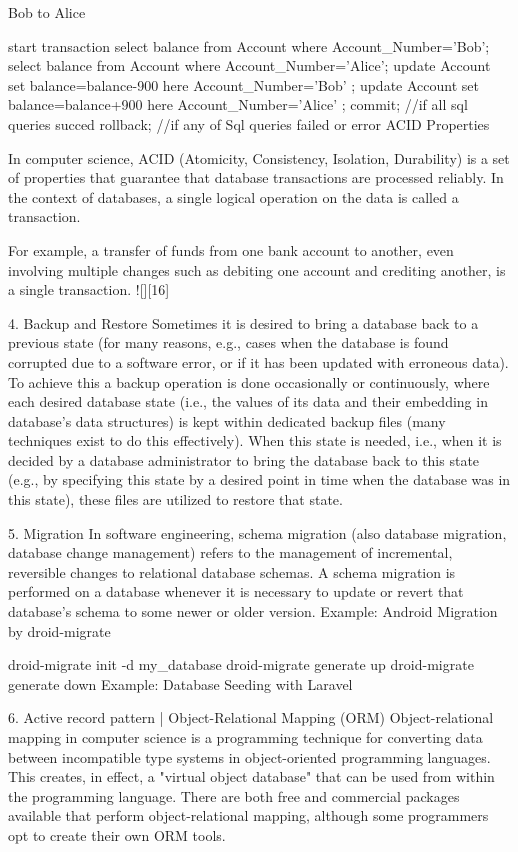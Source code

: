 Bob to Alice

start transaction
select balance from Account where Account_Number='Bob';
select balance from Account where Account_Number='Alice';
update Account set balance=balance-900 here Account_Number='Bob' ;
update Account set balance=balance+900 here Account_Number='Alice' ;
commit; //if all sql queries succed rollback; //if any of Sql queries failed or error
ACID Properties

In computer science, ACID (Atomicity, Consistency, Isolation, Durability) is a set of properties that guarantee that database transactions are processed reliably. In the context of databases, a single logical operation on the data is called a transaction.

For example, a transfer of funds from one bank account to another, even involving multiple changes such as debiting one account and crediting another, is a single transaction. ![][16]

4. Backup and Restore
Sometimes it is desired to bring a database back to a previous state (for many reasons, e.g., cases when the database is found corrupted due to a software error, or if it has been updated with erroneous data). To achieve this a backup operation is done occasionally or continuously, where each desired database state (i.e., the values of its data and their embedding in database's data structures) is kept within dedicated backup files (many techniques exist to do this effectively). When this state is needed, i.e., when it is decided by a database administrator to bring the database back to this state (e.g., by specifying this state by a desired point in time when the database was in this state), these files are utilized to restore that state.

5. Migration
In software engineering, schema migration (also database migration, database change management) refers to the management of incremental, reversible changes to relational database schemas. A schema migration is performed on a database whenever it is necessary to update or revert that database's schema to some newer or older version. Example: Android Migration by droid-migrate

droid-migrate init -d my_database droid-migrate generate up droid-migrate generate down
Example: Database Seeding with Laravel

6. Active record pattern | Object-Relational Mapping (ORM)
Object-relational mapping in computer science is a programming technique for converting data between incompatible type systems in object-oriented programming languages. This creates, in effect, a "virtual object database" that can be used from within the programming language. There are both free and commercial packages available that perform object-relational mapping, although some programmers opt to create their own ORM tools.


